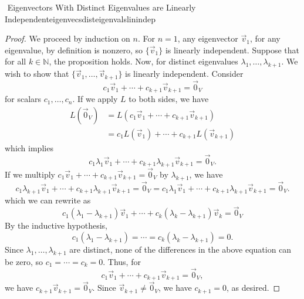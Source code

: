 \begin{theorem}{\Stop\,\,Eigenvectors With Distinct Eigenvalues are Linearly Independent}{eigenvecsdisteigenvalslinindep}
\begin{proof}
                We proceed by induction on \(n\). For \(n=1\), any eigenvector \(\vec{v}_1\), for any eigenvalue, by definition is nonzero, so \(\{\vec{v}_1\}\) is linearly independent. Suppose that for all \(k\in\mathbb{N}\), the proposition holds. Now, for distinct eigenvalues \(\lambda_1,\ldots,\lambda_{k+1}\). We wish to show that \(\{\vec{v}_1,\ldots,\vec{v}_{k+1}\}\) is linearly independent. Consider
                \begin{equation*}
                    c_1\vec{v}_1+\cdots+c_{k+1}\vec{v}_{k+1}=\vec{0}_V
                \end{equation*}
                for scalars \(c_1,\ldots,c_n\). If we apply \(L\) to both sides, we have
                \begin{align*}
                    L(\vec{0}_V)&=L(c_1\vec{v}_1+\cdots+c_{k+1}\vec{v}_{k+1}) \\
                    &=c_1L(\vec{v}_1)+\cdots+c_{k+1}L(\vec{v}_{k+1})
                \end{align*}
                which implies
                \begin{equation*}
                    c_1\lambda_1\vec{v}_1+\cdots+c_{k+1}\lambda_{k+1}\vec{v}_{k+1}=\vec{0}_V.
                \end{equation*}
                If we multiply \(c_1\vec{v}_1+\cdots+c_{k+1}\vec{v}_{k+1}=\vec{0}_V\) by \(\lambda_{k+1}\), we have
                \begin{equation*}
                    c_1\lambda_{k+1}\vec{v}_1+\cdots+c_{k+1}\lambda_{k+1}\vec{v}_{k+1}=\vec{0}_V=c_1\lambda_1\vec{v}_1+\cdots+c_{k+1}\lambda_{k+1}\vec{v}_{k+1}=\vec{0}_V.
                \end{equation*}
                which we can rewrite as
                \begin{equation*}
                    c_1(\lambda_1-\lambda_{k+1})\vec{v}_1+\cdots+c_k(\lambda_k-\lambda_{k+1})\vec{v}_k=\vec{0}_V
                \end{equation*}
                By the inductive hypothesis,
                \begin{equation*}
                    c_1(\lambda_1-\lambda_{k+1})=\cdots=c_k(\lambda_k-\lambda_{k+1})=0.
                \end{equation*}
                Since \(\lambda_1,\ldots,\lambda_{k+1}\) are distinct, none of the differences in the above equation can be zero, so \(c_1=\cdots=c_k=0\). Thus, for
                \begin{equation*}
                    c_1\vec{v}_1+\cdots+c_{k+1}\vec{v}_{k+1}=\vec{0}_V,
                \end{equation*}
                we have \(c_{k+1}\vec{v}_{k+1}=\vec{0}_V\). Since \(\vec{v}_{k+1}\neq\vec{0}_V\), we have \(c_{k+1}=0\), as desired.

            \end{proof}
            
        \end{theorem}
